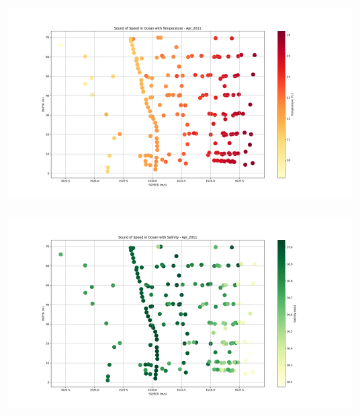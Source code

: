 \begin{figure}[ht] 
  \begin{subfigure}[b]{0.5\linewidth}
    \centering
    \includegraphics[width=0.9\linewidth]{figures/sspeed_temp.png}
    \label{fig:a} 
    \vspace{4ex}
  \end{subfigure}%
  \begin{subfigure}[b]{0.5\linewidth}
    \centering
    \includegraphics[width=0.9\linewidth]{figures/sspeed_sal.png} 
    \label{fig:b} 
    \vspace{4ex}
  \end{subfigure} 
\end{figure}

\newpage